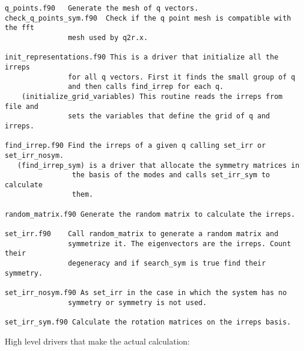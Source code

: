 \documentclass[12pt,a4paper]{article}
\begin{document}
\begin{verbatim}
q_points.f90   Generate the mesh of q vectors.
check_q_points_sym.f90  Check if the q point mesh is compatible with the fft
               mesh used by q2r.x.

init_representations.f90 This is a driver that initialize all the irreps 
               for all q vectors. First it finds the small group of q 
               and then calls find_irrep for each q.
    (initialize_grid_variables) This routine reads the irreps from file and
               sets the variables that define the grid of q and irreps.

find_irrep.f90 Find the irreps of a given q calling set_irr or set_irr_nosym.
   (find_irrep_sym) is a driver that allocate the symmetry matrices in
                the basis of the modes and calls set_irr_sym to calculate
                them.
  
random_matrix.f90 Generate the random matrix to calculate the irreps.

set_irr.f90    Call random_matrix to generate a random matrix and
               symmetrize it. The eigenvectors are the irreps. Count their
               degeneracy and if search_sym is true find their symmetry.

set_irr_nosym.f90 As set_irr in the case in which the system has no
               symmetry or symmetry is not used.

set_irr_sym.f90 Calculate the rotation matrices on the irreps basis.

\end{verbatim}

High level drivers that make the actual calculation:
\end{document}
